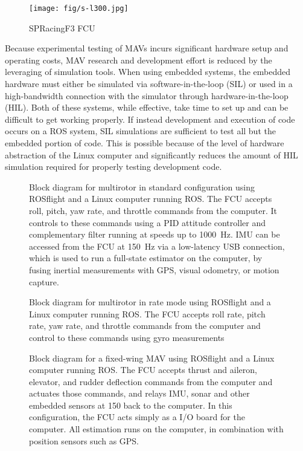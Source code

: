 \documentclass[letterpaper, 10 pt, conference]{ieeeconf}  %
\begin{document}
\begin{figure}
\centering
  \texttt{[image: fig/s-l300.jpg]}
  \caption{SPRacingF3 FCU}
    \label{fig:spracingf3}
\end{figure}

Because experimental testing of MAVs incurs significant hardware setup and operating costs, MAV research and development effort is reduced by the leveraging of simulation tools.  When using embedded systems, the embedded hardware must either be simulated via software-in-the-loop (SIL) or used in a high-bandwidth connection with the simulator through hardware-in-the-loop (HIL).  Both of these systems, while effective, take time to set up and can be difficult to get working properly.  If instead development and execution of code occurs on a ROS system, SIL simulations are sufficient to test all but the embedded portion of code. This is possible because of the level of hardware abstraction of the Linux computer and significantly reduces the amount of HIL simulation required for properly testing development code.


\begin{figure}[hbtp]
  \resizebox{0.5\textwidth}{!}{
  \centering
  
  }
  \caption{Block diagram for multirotor in standard configuration using ROSflight and a Linux computer running ROS.  The FCU accepts roll, pitch, yaw rate, and throttle commands from the computer.  It controls to these commands using a PID attitude controller and complementary filter running at speeds up to 1000~Hz.  IMU can be accessed from the FCU at 150~Hz via a low-latency USB connection, which is used to run a full-state estimator on the computer, by fusing inertial measurements with GPS, visual odometry, or motion capture.}
  \label{fig:att_block}
\end{figure}

\begin{figure}[hbtp]
  \resizebox{0.5\textwidth}{!}{
  \centering
  
  }
  \caption{Block diagram for multirotor in rate mode using ROSflight and a Linux computer running ROS.  The FCU accepts roll rate, pitch rate, yaw rate, and throttle commands from the computer and control to these commands using gyro measurements}
  \label{fig:att_rate_block}
\end{figure}

\begin{figure}[hbtp]
  \resizebox{0.5\textwidth}{!}{
  \centering
  
  }
  \caption{Block diagram for a fixed-wing MAV using ROSflight and a Linux computer running ROS.  The FCU accepts thrust and aileron, elevator, and rudder deflection commands from the computer and actuates those commands, and relays IMU, sonar and other embedded sensors at 150 back to the computer.  In this configuration, the FCU acts simply as a I/O board for the computer.  All estimation runs on the computer, in combination with position sensors such as GPS.}
  \label{fig:fw_block}
\end{figure}
	
\end{document}

